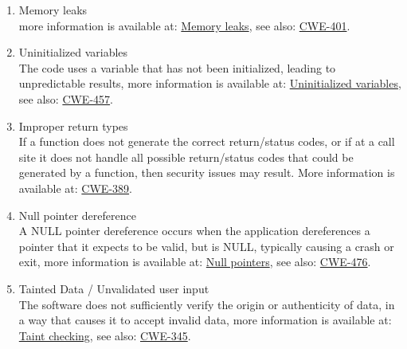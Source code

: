 \begin{enumerate}
\begin{enumerate}
         \item Memory leaks \\
               more information is available at:
               \href{http://en.wikipedia.org/wiki/Memory_leak}{Memory leaks}, 
               see also:
               \href{http://cwe.mitre.org/data/definitions/401.html}{CWE-401}.

         \item Uninitialized variables \\
               The code uses a variable that has not been initialized, leading to
               unpredictable results, more information is available at:
               \href{http://en.wikipedia.org/wiki/Uninitialized_variable}{Uninitialized variables}, 
               see also:
               \href{http://cwe.mitre.org/data/definitions/457.html}{CWE-457}.

         \item Improper return types \\
               If a function does not generate the correct return/status
               codes, or if at a call site it does not handle all possible return/status codes that could
               be generated by a function, then security issues may result. 
               More information is available at:
               \href{http://cwe.mitre.org/data/definitions/389.html}{CWE-389}.

         \item Null pointer dereference \\
               A NULL pointer dereference occurs when the application dereferences a
               pointer that it expects to be valid, but is NULL, typically causing a crash
               or exit, more information is available at:
               \href{http://en.wikipedia.org/wiki/Pointer}{Null pointers}, 
               see also:
               \href{http://cwe.mitre.org/data/definitions/476.html}{CWE-476}.

         \item Tainted Data / Unvalidated user input \\
               The software does not sufficiently verify the origin or authenticity of
               data, in a way that causes it to accept invalid data, more information is
               available at:
               \href{http://en.wikipedia.org/wiki/Taint_checking}{Taint checking}, 
               see also:
               \href{http://cwe.mitre.org/data/definitions/345.html}{CWE-345}.


\end{enumerate}
\end{enumerate}
